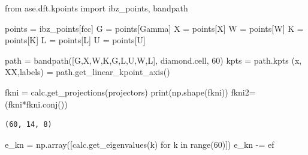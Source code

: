 \documentclass[
  letterpaper,
  DIV=11,
  numbers=noendperiod]{scrreprt}
\newenvironment{Shaded}{\begin{snugshade}}{\end{snugshade}}
\newcommand{\BuiltInTok}[1]{\textcolor[rgb]{0.00,0.23,0.31}{#1}}
\newcommand{\ControlFlowTok}[1]{\textcolor[rgb]{0.00,0.23,0.31}{#1}}
\newcommand{\DecValTok}[1]{\textcolor[rgb]{0.68,0.00,0.00}{#1}}
\newcommand{\ImportTok}[1]{\textcolor[rgb]{0.00,0.46,0.62}{#1}}
\newcommand{\KeywordTok}[1]{\textcolor[rgb]{0.00,0.23,0.31}{#1}}
\newcommand{\NormalTok}[1]{\textcolor[rgb]{0.00,0.23,0.31}{#1}}
\newcommand{\OperatorTok}[1]{\textcolor[rgb]{0.37,0.37,0.37}{#1}}
\newcommand{\StringTok}[1]{\textcolor[rgb]{0.13,0.47,0.30}{#1}}
\begin{document}
\begin{Shaded}
\begin{Highlighting}[]
\ImportTok{from}\NormalTok{ ase.dft.kpoints }\ImportTok{import}\NormalTok{ ibz\_points, bandpath}

\NormalTok{points }\OperatorTok{=}\NormalTok{ ibz\_points[}\StringTok{\textquotesingle{}fcc\textquotesingle{}}\NormalTok{]}
\NormalTok{G }\OperatorTok{=}\NormalTok{ points[}\StringTok{\textquotesingle{}Gamma\textquotesingle{}}\NormalTok{]}
\NormalTok{X }\OperatorTok{=}\NormalTok{ points[}\StringTok{\textquotesingle{}X\textquotesingle{}}\NormalTok{]}
\NormalTok{W }\OperatorTok{=}\NormalTok{ points[}\StringTok{\textquotesingle{}W\textquotesingle{}}\NormalTok{]}
\NormalTok{K }\OperatorTok{=}\NormalTok{ points[}\StringTok{\textquotesingle{}K\textquotesingle{}}\NormalTok{]}
\NormalTok{L }\OperatorTok{=}\NormalTok{ points[}\StringTok{\textquotesingle{}L\textquotesingle{}}\NormalTok{]}
\NormalTok{U }\OperatorTok{=}\NormalTok{ points[}\StringTok{\textquotesingle{}U\textquotesingle{}}\NormalTok{]}


\NormalTok{path }\OperatorTok{=}\NormalTok{ bandpath([G,X,W,K,G,L,U,W,L], diamond.cell, }\DecValTok{60}\NormalTok{)}
\NormalTok{kpts }\OperatorTok{=}\NormalTok{ path.kpts}
\NormalTok{(x, XX,labels) }\OperatorTok{=}\NormalTok{ path.get\_linear\_kpoint\_axis()}
\end{Highlighting}
\end{Shaded}

\begin{Shaded}
\begin{Highlighting}[]
\NormalTok{fkni }\OperatorTok{=}\NormalTok{ calc.get\_projections(}\StringTok{\textquotesingle{}projectors\textquotesingle{}}\NormalTok{)}
\BuiltInTok{print}\NormalTok{(np.shape(fkni))}
\NormalTok{fkni2}\OperatorTok{=}\NormalTok{(fkni}\OperatorTok{*}\NormalTok{fkni.conj())}
\end{Highlighting}
\end{Shaded}

\begin{verbatim}
(60, 14, 8)
\end{verbatim}

\begin{Shaded}
\begin{Highlighting}[]
\NormalTok{e\_kn }\OperatorTok{=}\NormalTok{ np.array([calc.get\_eigenvalues(k) }\ControlFlowTok{for}\NormalTok{ k }\KeywordTok{in} \BuiltInTok{range}\NormalTok{(}\DecValTok{60}\NormalTok{)])}
\NormalTok{e\_kn }\OperatorTok{{-}=}\NormalTok{ ef}
\end{Highlighting}
\end{Shaded}
\end{document}
